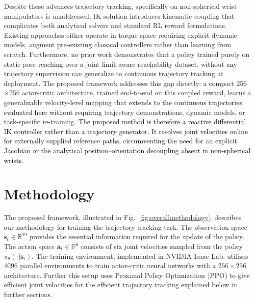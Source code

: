 \documentclass[preprint,12pt]{elsarticle}
\begin{document}
Despite these advances trajectory tracking, specifically on non-spherical wrist manipulators is unaddressed, IK solution introduces kinematic coupling that complicates both analytical solvers and standard RL reward formulations. Existing approaches either operate in torque space requiring explicit dynamic models, augment pre-existing classical controllers rather than learning from scratch. Furthermore, no prior work demonstrates that a policy trained purely on static pose reaching over a joint limit aware reachability dataset, without any trajectory supervision can generalize to continuous trajectory tracking at deployment. The proposed framework addresses this gap directly: a compact
256$\times$256 actor-critic architecture, trained end-to-end on this
coupled reward, learns a generalizable velocity-level mapping that
\textcolor{black}{extends to the continuous trajectories evaluated here without requiring}
trajectory demonstrations, dynamic models, or task-specific re-training. \textcolor{black}{The proposed method is therefore a reactive differential IK controller rather than a trajectory generator. It resolves joint velocities online for externally supplied reference paths, circumventing the need for an explicit Jacobian or the analytical position--orientation decoupling absent in non-spherical wrists.}


 \section{Methodology}
\label{method}
The proposed framework, illustrated in Fig.~\ref{fig:overallmethodology}, describes our methodology for training the trajectory tracking task. The observation space $\mathbf{s}_t \in \mathbb{R}^{19}$ provides the essential information required for the update of the policy. The action space $\mathbf{a}_t \in \mathbb{R}^{6}$ consists of six joint velocities sampled from the policy $\pi_\theta(\cdot|\mathbf{s}_\text{t})$. The training environment, implemented in NVIDIA Isaac Lab, utilizes 4096 parallel environments to train actor-critic neural networks with a $256\times256$ architecture. Further this setup uses Proximal Policy Optimization (PPO) to give efficient joint velocities for the efficient trajectory tracking explained below in further sections.
\end{document}
